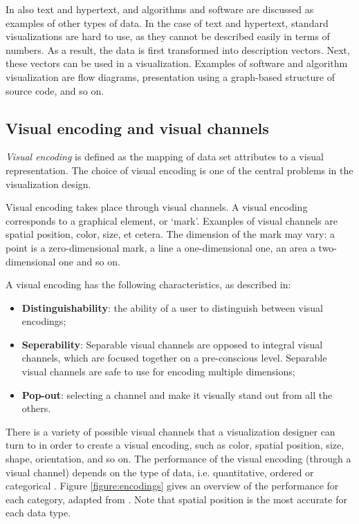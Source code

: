 In \cite{keim:2002} also text and hypertext, and algorithms and software are discussed as examples of other types of data. In the case of text and hypertext, standard visualizations are hard to use, as they cannot be described easily in terms of numbers. As a result, the data is first transformed into description vectors. Next, these vectors can be used in a visualization. Examples of software and algorithm visualization are flow diagrams, presentation using a graph-based structure of source code, and so on\cite{keim:2002}.


\subsection{Visual encoding and visual channels}\label{chapter:literature_study:section:interaction:subsection:encoding}


\emph{Visual encoding} is defined as the mapping of data set attributes to a visual representation. The choice of visual encoding is one of the central problems in the visualization design\cite{shirley:2009}.

Visual encoding takes place through visual channels. A visual encoding corresponds to a graphical element, or ‘mark’. Examples of visual channels are spatial position, color, size, et cetera. The dimension of the mark may vary: a point is a zero-dimensional mark, a line a one-dimensional one, an area a two-dimensional one and so on.

A visual encoding has the following characteristics, as described in\cite{shirley:2009}:

\begin{itemize}
	\item \textbf{Distinguishability}: the ability of a user to distinguish between visual encodings;
	\item \textbf{Seperability}: Separable visual channels are opposed to integral visual channels, which are focused together on a pre-conscious level. Separable visual channels are safe to use for encoding multiple dimensions;
	\item \textbf{Pop-out}: selecting a channel and make it visually stand out from all the others.
\end{itemize}


There is a variety of possible visual channels that a visualization designer can turn to in order to create a visual encoding, such as color, spatial position, size, shape, orientation, and so on. The performance of the visual encoding (through a visual channel) depends on the type of data, i.e. quantitative, ordered or categorical \cite{shirley:2009}. Figure \ref{figure:encodings} gives an overview of the performance for each category, adapted from \cite{shirley:2009}. Note that spatial position is the most accurate for each data type.

